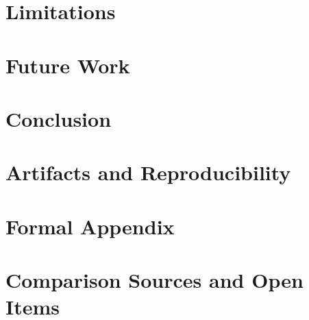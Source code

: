 \section{Limitations}\label{sec:limits}

\section{Future Work}\label{sec:agents}

\section{Conclusion}\label{sec:conclusion}

\appendix
\section{Artifacts and Reproducibility}\label{sec:repro}

\section{Formal Appendix}\label{sec:formal-appendix}

\section{Comparison Sources and Open Items}\label{sec:compare-appendix}

